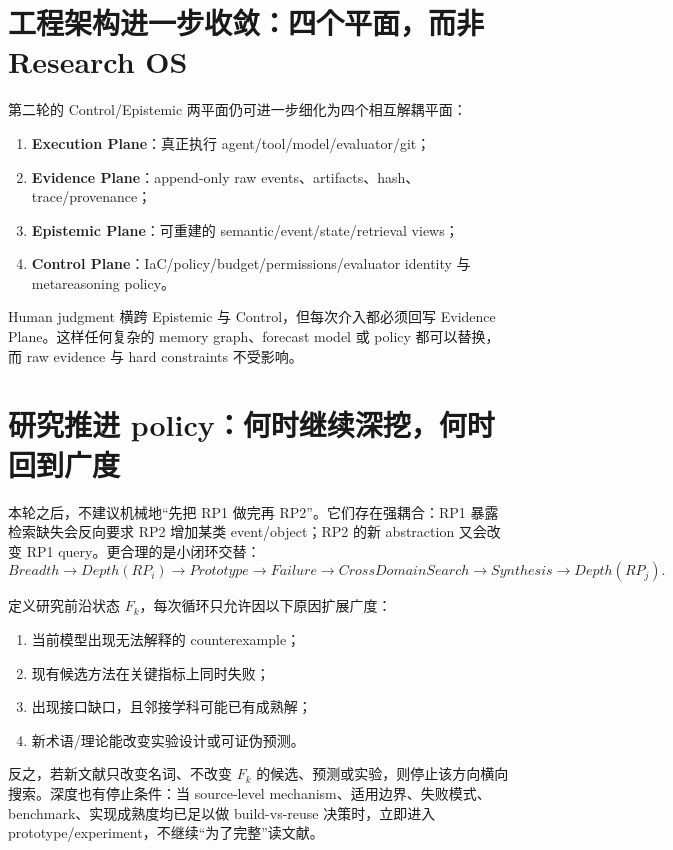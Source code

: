 \documentclass[11pt,a4paper]{ctexart}
\begin{document}
\section{工程架构进一步收敛：四个平面，而非 Research OS}

第二轮的 Control/Epistemic 两平面仍可进一步细化为四个相互解耦平面：
\begin{enumerate}
\item \textbf{Execution Plane}：真正执行 agent/tool/model/evaluator/git；
\item \textbf{Evidence Plane}：append-only raw events、artifacts、hash、trace/provenance；
\item \textbf{Epistemic Plane}：可重建的 semantic/event/state/retrieval views；
\item \textbf{Control Plane}：IaC/policy/budget/permissions/evaluator identity 与 metareasoning policy。
\end{enumerate}
Human judgment 横跨 Epistemic 与 Control，但每次介入都必须回写 Evidence Plane。这样任何复杂的 memory graph、forecast model 或 policy 都可以替换，而 raw evidence 与 hard constraints 不受影响。

\section{研究推进 policy：何时继续深挖，何时回到广度}

本轮之后，不建议机械地“先把 RP1 做完再 RP2”。它们存在强耦合：RP1 暴露检索缺失会反向要求 RP2 增加某类 event/object；RP2 的新 abstraction 又会改变 RP1 query。更合理的是小闭环交替：
\begin{equation}
Breadth\to Depth(RP_i)\to Prototype\to Failure\to CrossDomainSearch\to Synthesis\to Depth(RP_j).
\end{equation}

定义研究前沿状态 $F_k$，每次循环只允许因以下原因扩展广度：
\begin{enumerate}
\item 当前模型出现无法解释的 counterexample；
\item 现有候选方法在关键指标上同时失败；
\item 出现接口缺口，且邻接学科可能已有成熟解；
\item 新术语/理论能改变实验设计或可证伪预测。
\end{enumerate}
反之，若新文献只改变名词、不改变 $F_k$ 的候选、预测或实验，则停止该方向横向搜索。深度也有停止条件：当 source-level mechanism、适用边界、失败模式、benchmark、实现成熟度均已足以做 build-vs-reuse 决策时，立即进入 prototype/experiment，不继续“为了完整”读文献。
\end{document}

